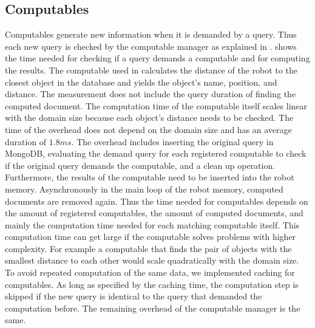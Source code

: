 \subsection{Computables}
\label{sec:eval-computables}
Computables generate new information when it is demanded by a
query. Thus each new query is checked by the computable manager as
explained in . 
shows the time needed for checking if a query demands a computable and
for computing the results. The computable used in
 calculates the distance of the robot
to the closest object in the database and yields the object's name,
position, and distance. The measurement does not include the query
duration of finding the computed document. The computation time of
the computable itself scales linear with the domain size because each
object's distance needs to be checked. The time of the overhead does
not depend on the domain size and has an average duration of $1.8ms$. The overhead includes inserting the
original query in MongoDB, evaluating the demand query for each
registered computable to check if the original query demands the
computable, and a clean up operation. Furthermore, the results of the
computable need to be inserted into the robot memory. Asynchronously
in the main loop of the robot memory, computed documents are removed
again. Thus the time needed for computables depends on the amount of
registered computables, the amount of computed documents, and mainly
the computation time needed for each matching computable itself. This
computation time can get large if the computable solves problems with
higher complexity. For example a computable that finds the pair of
objects with the smallest distance to each other would scale
quadratically with the domain size. To avoid repeated computation of
the same data, we implemented caching for computables. As long as
specified by the caching time, the computation step is skipped if the
new query is identical to the query that demanded the computation
before. The remaining overhead of the computable manager is the same.

